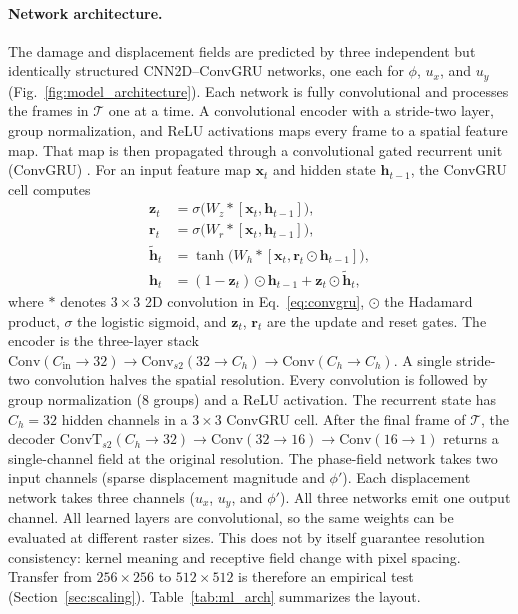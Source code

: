 \documentclass[10pt]{article}
\theoremstyle{definition}
\begin{document}
\paragraph{Network architecture.}
The damage and displacement fields are predicted by three independent but identically structured CNN2D--ConvGRU networks, one each for $\phi$, $u_x$, and $u_y$ (Fig.~\ref{fig:model_architecture}).
%
Each network is fully convolutional and processes the frames in $\mathcal{T}$ one at a time.
%
A convolutional encoder with a stride-two layer, group normalization, and ReLU activations maps every frame to a spatial feature map.
%
That map is then propagated through a convolutional gated recurrent unit (ConvGRU) \cite{ballas2016,shi2015}.
%
For an input feature map $\mathbf{x}_t$ and hidden state $\mathbf{h}_{t-1}$, the ConvGRU cell computes
%
\begin{align}
    \mathbf{z}_t &= \sigma\big(W_z \ast [\mathbf{x}_t,\mathbf{h}_{t-1}]\big), \\
    \mathbf{r}_t &= \sigma\big(W_r \ast [\mathbf{x}_t,\mathbf{h}_{t-1}]\big), \\
    \tilde{\mathbf{h}}_t &= \tanh\big(W_h \ast [\mathbf{x}_t,\mathbf{r}_t\odot\mathbf{h}_{t-1}]\big), \\
    \mathbf{h}_t &= (1-\mathbf{z}_t)\odot\mathbf{h}_{t-1} + \mathbf{z}_t\odot\tilde{\mathbf{h}}_t,
    \label{eq:convgru}
\end{align}
%
where $\ast$ denotes $3\times3$ 2D convolution in Eq.~\eqref{eq:convgru}, $\odot$ the Hadamard product, $\sigma$ the logistic sigmoid, and $\mathbf{z}_t$, $\mathbf{r}_t$ are the update and reset gates.
%
The encoder is the three-layer stack $\mathrm{Conv}(C_{\mathrm{in}}\!\to\!32)\to\mathrm{Conv}_{s2}(32\!\to\!C_h)\to\mathrm{Conv}(C_h\!\to\!C_h)$.
%
A single stride-two convolution halves the spatial resolution.
%
Every convolution is followed by group normalization (8 groups) and a ReLU activation.
%
The recurrent state has $C_h=32$ hidden channels in a $3\times3$ ConvGRU cell.
%
After the final frame of $\mathcal{T}$, the decoder $\mathrm{ConvT}_{s2}(C_h\!\to\!32)\to\mathrm{Conv}(32\!\to\!16)\to\mathrm{Conv}(16\!\to\!1)$ returns a single-channel field at the original resolution.
%
The phase-field network takes two input channels (sparse displacement magnitude and $\phi'$).
%
Each displacement network takes three channels ($u_x$, $u_y$, and $\phi'$).
%
All three networks emit one output channel.
%
All learned layers are convolutional, so the same weights can be evaluated at different raster sizes.
%
This does not by itself guarantee resolution consistency: kernel meaning and receptive field change with pixel spacing.
%
Transfer from $256\times256$ to $512\times512$ is therefore an empirical test (Section~\ref{sec:scaling}).
%
Table~\ref{tab:ml_arch} summarizes the layout.
\end{document}
